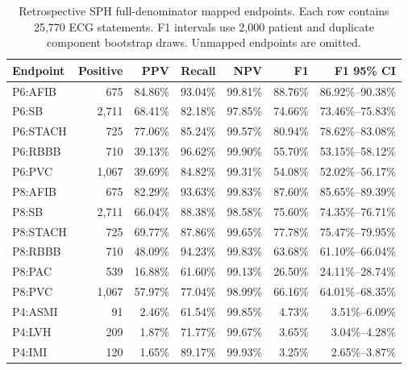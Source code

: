 \begin{table}[tbp]
\caption{Retrospective SPH full-denominator mapped endpoints. Each row contains 25,770 ECG statements. F1 intervals use 2,000 patient and duplicate component bootstrap draws. Unmapped endpoints are omitted.\label{tab:sph_endpoints}}
\centering\small
\begin{tabular}{lrrrrrr}
\toprule
Endpoint & Positive & PPV & Recall & NPV & F1 & F1 95\% CI \\
\midrule
P6:AFIB & 675 & 84.86\% & 93.04\% & 99.81\% & 88.76\% & 86.92\%--90.38\% \\
P6:SB & 2,711 & 68.41\% & 82.18\% & 97.85\% & 74.66\% & 73.46\%--75.83\% \\
P6:STACH & 725 & 77.06\% & 85.24\% & 99.57\% & 80.94\% & 78.62\%--83.08\% \\
P6:RBBB & 710 & 39.13\% & 96.62\% & 99.90\% & 55.70\% & 53.15\%--58.12\% \\
P6:PVC & 1,067 & 39.69\% & 84.82\% & 99.31\% & 54.08\% & 52.02\%--56.17\% \\
P8:AFIB & 675 & 82.29\% & 93.63\% & 99.83\% & 87.60\% & 85.65\%--89.39\% \\
P8:SB & 2,711 & 66.04\% & 88.38\% & 98.58\% & 75.60\% & 74.35\%--76.71\% \\
P8:STACH & 725 & 69.77\% & 87.86\% & 99.65\% & 77.78\% & 75.47\%--79.95\% \\
P8:RBBB & 710 & 48.09\% & 94.23\% & 99.83\% & 63.68\% & 61.10\%--66.04\% \\
P8:PAC & 539 & 16.88\% & 61.60\% & 99.13\% & 26.50\% & 24.11\%--28.74\% \\
P8:PVC & 1,067 & 57.97\% & 77.04\% & 98.99\% & 66.16\% & 64.01\%--68.35\% \\
P4:ASMI & 91 & 2.46\% & 61.54\% & 99.85\% & 4.73\% & 3.51\%--6.09\% \\
P4:LVH & 209 & 1.87\% & 71.77\% & 99.67\% & 3.65\% & 3.04\%--4.28\% \\
P4:IMI & 120 & 1.65\% & 89.17\% & 99.93\% & 3.25\% & 2.65\%--3.87\% \\
\bottomrule
\end{tabular}
\end{table}